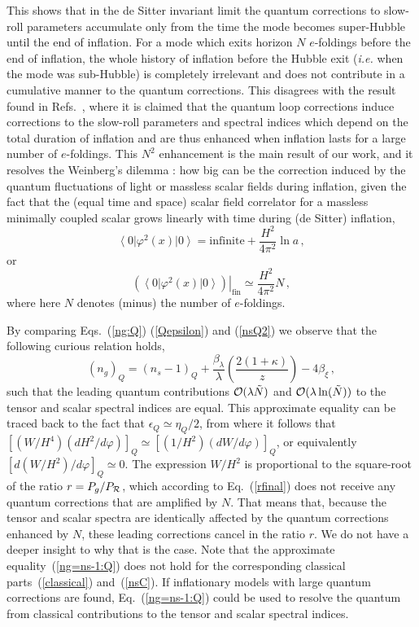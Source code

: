 This shows that in the de Sitter
invariant limit the quantum corrections to slow-roll parameters
accumulate only from the time the mode becomes super-Hubble until
the end of inflation. For a mode which exits horizon $N$
$e$-foldings before the end of inflation, the whole history of
inflation before the Hubble exit ({\it i.e.} when the mode was
sub-Hubble) is completely irrelevant and does not contribute in a
cumulative manner to the quantum corrections. This disagrees with
the result found in Refs.~\cite{Sloth:2006az,Sloth:2006nu}, where
it is claimed that the quantum loop corrections induce corrections
to the slow-roll parameters and spectral indices which depend on
the total duration of inflation and are thus enhanced when
inflation lasts for a large number of $e$-foldings.
 This $N^2$ enhancement is the main result of our work, and it
resolves the Weinberg's dilemma \cite{Weinberg:2005,Weinberg:2006}:
how big can be the correction induced by the quantum fluctuations
of light or massless scalar fields during inflation,
given the fact that the (equal time and space) scalar
field correlator for a massless minimally coupled scalar grows
linearly with time during (de Sitter) inflation,
\begin{equation}
\left<0\right|\varphi^2(x)\left|0\right> = \mathrm{infinite}
+\frac{H^2}{4\pi^2}\ln a\,,
\end{equation}
or
\begin{equation}
\left.\left(\left<0\right|\varphi^2(x)\left|0\right>\right)\right|_{\mathrm{fin}}
\simeq \frac{H^2}{4\pi^2}N\,,
\end{equation}
where here $N$ denotes (minus) the number of $e$-foldings.

 By comparing Eqs.~(\ref{ng:Q}) (\ref{Qepsilon}) and (\ref{nsQ2}) 
we observe that the following curious relation holds, 
\begin{equation}
(n_g)_Q = (n_s-1)_Q 
        + \frac{\beta_\lambda}{\lambda}
                \left(\frac{2(1+\kappa)}{z}
                \right)
         -4 \beta_\xi
\,,
\label{ng=ns-1:Q}
\end{equation}
such that the leading quantum contributions ${\cal O}(\lambda \tilde N)$
and ${\cal O}(\lambda \ln(\tilde N))$
to the tensor and scalar spectral indices are equal. 
This approximate equality can be traced back to the fact that 
$\epsilon_Q\simeq \eta_Q/2$, from where it follows that 
$[(W/H^4)(dH^2/d\varphi)]_Q\simeq [(1/H^2) (dW/d\varphi)]_Q$,
or equivalently $[d(W/H^2)/d\varphi]_Q\simeq 0$. The expression 
$W/H^2$ is proportional to the square-root of the ratio 
$r=P_g/P_{\cal R}$, which according to Eq.~(\ref{rfinal}) 
does not receive any quantum corrections that are amplified by $N$. That means
that, because the tensor and scalar spectra are identically 
affected by the quantum corrections enhanced by $N$, 
these leading corrections cancel in the ratio $r$.
We do not have a deeper insight to why that is the case. 
Note that the approximate equality~(\ref{ng=ns-1:Q}) does not 
hold for the corresponding classical parts~(\ref{classical}) and~(\ref{nsC}).
 If inflationary models with large quantum corrections are found, 
Eq.~(\ref{ng=ns-1:Q}) could be used to resolve the quantum
from classical contributions to the tensor and scalar spectral indices. 

